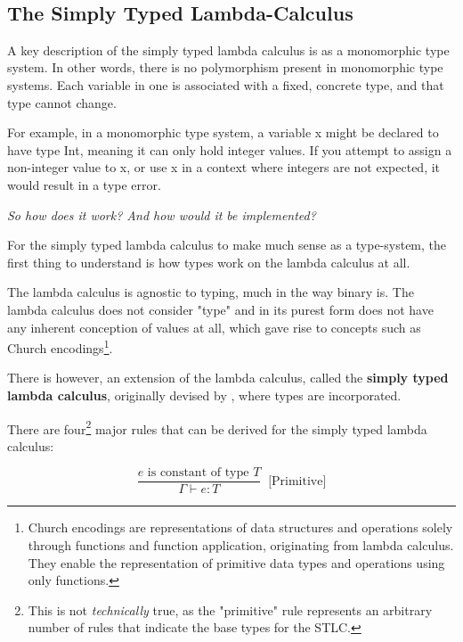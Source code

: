 \documentclass{l4proj}
\begin{document}
\

\subsection{The Simply Typed Lambda-Calculus}

A key description of the simply typed lambda calculus is as a monomorphic type system.
In other words, there is no polymorphism present in monomorphic type systems. 
Each variable in one is associated with a fixed, concrete type, and that type cannot change.

For example, in a monomorphic type system, a variable x might be declared to have type Int, meaning it can only hold integer values.
If you attempt to assign a non-integer value to x, or use x in a context where integers are not expected, it would result in a type error.



\emph{So how does it work? And how would it be implemented?}

For the simply typed lambda calculus to make much sense as a type-system, the first thing to understand is how types work on the lambda calculus at all.

The lambda calculus is agnostic to typing, much in the way binary is.
The lambda calculus does not consider "type" and in its purest form does not have any inherent conception of values at all, which gave rise to concepts such as Church encodings\footnote{Church encodings are representations of data structures and operations solely through functions and function application, originating from lambda calculus. They enable the representation of primitive data types and operations using only functions.}. 

There is however, an extension of the lambda calculus, called the \textbf{simply typed lambda calculus}, originally devised by \citet{Church_1940}, where types are incorporated.

There are four\footnote{This is not \emph{technically} true, as the "primitive" rule represents an arbitrary number of rules that indicate the base types for the STLC.} major rules that can be derived for the simply typed lambda calculus\citep{Stlc_upenn}:


\begin{equation*} \label{eq:stlc-primitives-rule}
    \frac{e\text{ is constant of type }T}{\Gamma \vdash e:T} \;\;\text{[Primitive]}
\end{equation*}
\end{document}
